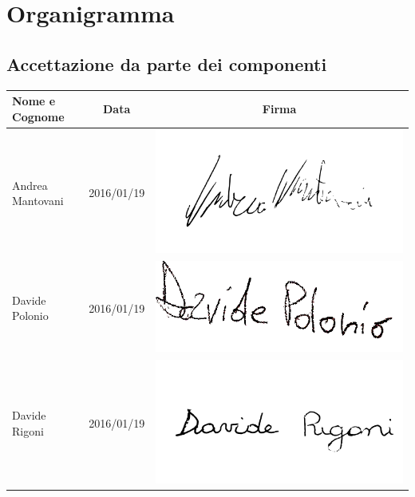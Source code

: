 \section*{Organigramma} %
\subsection*{Accettazione da parte dei componenti}
\begin{center}
  \begin{tabular}{ l | c | c }
    \hline
    \textbf{Nome e Cognome} & \textbf{Data} & \textbf{Firma} \\
    \hline
    Andrea Mantovani & 2016/01/19 & \includegraphics[scale=0.1]{res/img/organigramma/AndreaMantovani}  \\ \hline
    Davide Polonio & 2016/01/19 &  \includegraphics[scale=1]{res/img/organigramma/DavidePolonio} \\ \hline
    Davide Rigoni & 2016/01/19 & \includegraphics[scale=0.1]{res/img/organigramma/DavideRigoni} \\ \hline

\end{tabular}
\end{center}
